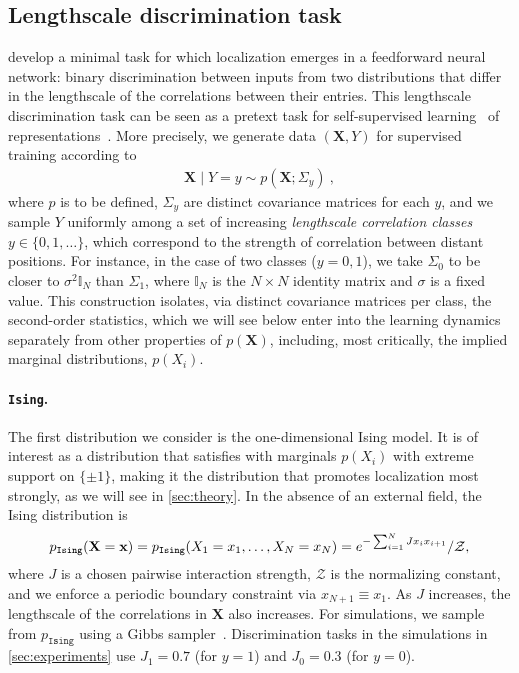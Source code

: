 \subsection{Lengthscale discrimination task}
\label{sec:task}

\textcite{ingrosso2022data} develop a minimal task for which localization emerges in a feedforward neural network: binary discrimination between inputs from two distributions that differ in the lengthscale of the correlations between their entries.
This lengthscale discrimination task can be seen as a pretext task for self-supervised learning~\parencite{kolesnikov2019revisiting,chen2020simple} of representations~\parencite[\cf~unsupervised:][]{olshausen1996emergence,bell1997independent}.
More precisely, we generate data $(\mathbf{X},Y)$ for supervised training according to
\begin{align} \label{eq:task}
    \mathbf{X} \mid Y = y \sim p(\mathbf{X};\Sigma_y)~,
\end{align}
where $p$ is to be defined, $\Sigma_y$ are distinct covariance matrices for each $y$, and we sample $Y$ uniformly among a set of increasing \emph{lengthscale correlation classes} $y \in \{0,1,\ldots\}$, which correspond to the strength of correlation between distant positions.
For instance, in the case of two classes ($y = 0, 1$), we take $\Sigma_0$ to be closer to $\sigma^2 \mathbb{I}_N$ than $\Sigma_1$, where $\mathbb{I}_N$ is the $N \times N$ identity matrix and $\sigma$ is a fixed value.
This construction isolates, via distinct covariance matrices per class, the second-order statistics, which we will see below enter into the learning dynamics separately from other properties of $p(\mathbf{X})$, including, most critically, the implied marginal distributions, $p(X_i)$.

\paragraph{\texttt{Ising}.}\hspace{-2pt}
The first distribution we consider is the one-dimensional Ising model.
It is of interest as a distribution that satisfies  with marginals $p(X_i)$ with extreme support on $\{ \pm 1 \}$,
making it the distribution that promotes localization most strongly, as we will see in \cref{sec:theory}.
In the absence of an external field, the Ising distribution is
\begin{equation}
    p_\text{\texttt{Ising}}(\mathbf{X}=\mathbf{x})
    = p_\text{\texttt{Ising}}(X_1=x_1,\ldots,X_N=x_N) = e^{ -\sum_{i=1}^{N} J x_i x_{i+1} } / \mathcal{Z},
\end{equation}
where $J$ is a chosen pairwise interaction strength, $\mathcal{Z}$ is the normalizing constant, and we enforce a periodic boundary constraint via $x_{N+1} \equiv x_1$.
As $J$ increases, the lengthscale of the correlations in $\mathbf{X}$ also increases.
For simulations, we sample from $p_\texttt{Ising}$ using a Gibbs sampler~\parencite{geman1984stochastic}.
Discrimination tasks in the simulations in 
\cref{sec:experiments}
use $J_1=0.7$ (for $y=1$) and $J_0=0.3$ (for $y=0$).

